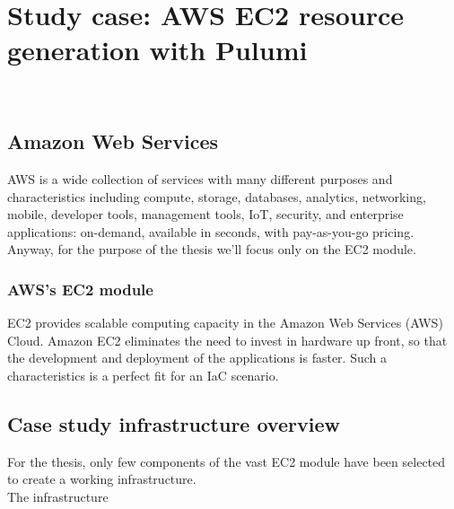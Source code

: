 
\chapter{Study case: AWS EC2 resource generation with Pulumi}
\label{cap:case-study}

\\

\section{Amazon Web Services}
AWS is a wide collection of services with many different purposes and characteristics including compute, storage, databases, analytics, networking, mobile, developer tools, management tools, IoT, security, and enterprise applications: on-demand, available in seconds, with pay-as-you-go pricing.
Anyway, for the purpose of the thesis we'll focus only on the EC2 module.

\subsection{AWS's EC2 module}
EC2 provides scalable computing capacity in the Amazon Web Services (AWS) Cloud.
Amazon EC2 eliminates the need to invest in hardware up front, so that the development and deployment of the applications is faster.
Such a characteristics is a perfect fit for an IaC scenario.

\section{Case study infrastructure overview}
For the thesis, only few components of the vast EC2 module have been selected to create a working infrastructure.\\
The infrastructure

